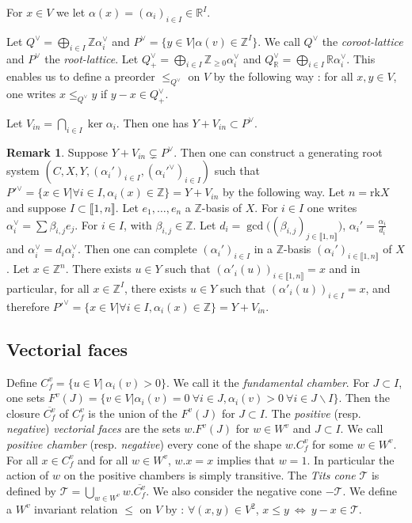 \documentclass[12pt]{article}
\theoremstyle{plain}
\theoremstyle{definition}
\newtheorem{rque}[thm]{Remark}
\newcommand{\R}{\mathbb{R}}
\newcommand{\N}{\mathbb{Z}_{\geq 0}}
\newcommand{\Z}{\mathbb{Z}}
\begin{document}
For $x\in V$ we let $\alpha(x)=(\alpha_i)_{i\in I}\in \R^I$.

Let  $Q^\vee=\bigoplus_{i\in I}\Z\alpha_i^\vee$ and $P^\vee=\{y\in V |\alpha(v)\in \Z^I\}$. We call  $Q^\vee$ the \textit{coroot-lattice} and $P^\vee$ the \textit{root-lattice}. Let $Q_+^\vee=\bigoplus_{i\in I}\N \alpha_i^\vee$ and $Q^\vee_{\mathbb{R}}=\bigoplus_{i\in I}\R\alpha_i^\vee$. This enables us to define a preorder $\leq_{Q^\vee}$ on $V$ by the following way : for all $x,y\in V$, one writes $x\leq_{Q^\vee}y$ if $y-x\in Q^\vee_+$. 




Let $V_{in}=\bigcap_{i\in I}\ker \alpha_i$. Then one has $Y+V_{in}\subset P^\vee$. 


\begin{rque}
Suppose $Y+V_{in}\varsubsetneq P^\vee$. Then one can construct a generating root system $(C,X,Y,(\alpha_i')_{i\in I},(\alpha_i'^\vee)_{i\in I})$ such that $P'^\vee=\{x\in V|\forall i\in I, \alpha_i(x)\in \Z\}=Y+V_{in}$ by the following way.
 Let $n=\mathrm{rk} X$ and suppose $I\subset\llbracket 1,n\rrbracket$. Let $e_1,\ldots,e_n$ a $\mathbb{Z}$-basis of $X$. For $i\in I$ one writes 
$\alpha_i^\vee=\sum\beta_{i,j}e_j$. For $i\in I$, with $\beta_{i,j}\in \Z$. Let 
$d_i=\gcd\big((\beta_{i,j})_{j\in \llbracket 1 ,n\rrbracket}\big)$,  $\alpha_i'=\frac{\alpha_i}{d_i}$ and $\alpha_i^\vee=d_i\alpha_i^\vee$. Then one can complete $(\alpha_i')_{i\in I}$ in a $\Z$-basis $(\alpha_i')_{i\in \llbracket 1, n\rrbracket} $ of $X$. Let $x\in \Z^n$. There exists $u\in Y$ such that $(\alpha'_i(u))_{i\in \llbracket 1,n\rrbracket}=x$ and in particular, for all $x\in \Z^I$, there exists $u\in Y$ such that $(\alpha'_i(u))_{i\in I}=x$, and therefore $P'^\vee=\{x\in V|\forall i\in I, \alpha_i(x)\in \Z\}=Y+V_{in}.$
\end{rque}

\subsection{Vectorial faces}

Define $C_f^v=\{u\in V|\ \alpha_i(v)>0\}$. We call it the \textit{fundamental chamber}. For $J\subset I$, one sets $F^v(J)=\{v\in V|\alpha_i(v)=0\ \forall i\in J,\alpha_i(v)>0\ \forall i\in J\backslash I\}$. Then the closure $\overline{C_f^v}$ of $C_f^v$ is the union of the $F^v(J)$ for $J\subset I$. The \textit{positive} (resp. \textit{negative}) \textit{vectorial faces} are the sets $w.F^v(J)$ for $w\in W^v$ and $J\subset I$.  We call \textit{positive chamber} (resp. \textit{negative}) every cone  of the shape $w.C_f^v$ for some $w\in W^v$.  For all $x\in C_f^v$ and for all $w\in W^v$, $w.x=x$ implies that $w=1$. In particular the action of $w$ on the positive chambers is simply transitive. The \textit{Tits cone} $\mathcal T$ is defined by $\mathcal{T}=\bigcup_{w\in W^v} w.\overline{C^v_f}$. We also consider the negative cone $-\mathcal{T}$.
We define a $W^v$ invariant relation $\leq$ on $V$ by : $\forall (x,y)\in V\mathrm{}^2$, $x\leq y\ \Leftrightarrow\ y-x\in \mathcal{T}$.
\end{document}
